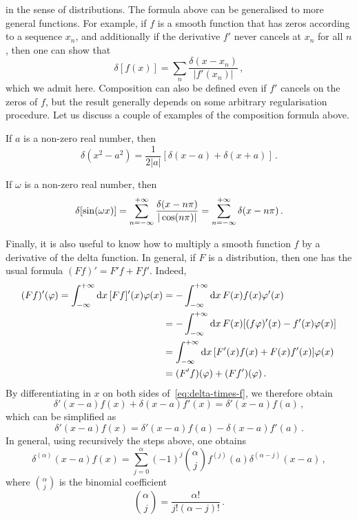 in the sense of distributions. The formula above can be generalised to more general
functions. For example, if $f$ is a smooth function that has zeros according to a sequence
$x_n$, and additionally if the derivative $f'$ never cancels at $x_n$ for all $n$, then
one can show that
\begin{equation}
	\delta[f(x)]=\sum_n\frac{\delta(x-x_n)}{|f'(x_n)|}\,,
\end{equation}
which we admit here. Composition can also be defined even if $f'$ cancels on the zeros of
$f$, but the result generally depends on some arbitrary regularisation procedure. Let us
discuss a couple of examples of the composition formula above.
\begin{example}
	If $a$ is a non-zero real number, then
	\begin{equation}
		\delta(x^2-a^2)=\frac{1}{2|a|}[\delta(x-a)+\delta(x+a)]\,.
	\end{equation}
\end{example}
\begin{example}
	If $\omega$ is a non-zero real number, then
	\begin{equation}
		\delta[\sin(\omega x)]=\sum_{n=-\infty}^{+\infty}\frac{\delta(x-n\pi)}{|\cos(n\pi)|}=\sum_{n=-\infty}^{+\infty}\delta(x-n\pi)\,.
	\end{equation}
\end{example}

Finally, it is also useful to know how to multiply a smooth function $f$ by a derivative
of the delta function. In general, if $F$ is a distribution, then one has the usual
formula $(Ff)'=F'f+Ff'$. Indeed,
\begin{align}
	(Ff)'(\varphi)=\int_{-\infty}^{+\infty}\mathrm{d}{x}\,[Ff]'(x)\varphi(x)
	 & =-\int_{-\infty}^{+\infty}\mathrm{d}{x}\,F(x)f(x)\varphi'(x)\notag                  \\
	 & =-\int_{-\infty}^{+\infty}\mathrm{d}{x}\,F(x)[(f\varphi)'(x)-f'(x)\varphi(x)]\notag \\
	 & =\int_{-\infty}^{+\infty}\mathrm{d}{x}\,[F'(x)f(x)+F(x)f'(x)]\varphi(x)\notag       \\
	 & =(F'f)(\varphi)+(Ff')(\varphi)\,.
\end{align}
By differentiating in $x$ on both sides of~\cref{eq:delta-times-f}, we therefore obtain
\begin{equation}
	\delta'(x-a)f(x)+\delta(x-a)f'(x)=\delta'(x-a)f(a)\,,
\end{equation}
which can be simplified as
\begin{equation}
	\label{eq:delta1-times-f}
	\delta'(x-a)f(x)=\delta'(x-a)f(a)-\delta(x-a)f'(a)\,.
\end{equation}
In general, using recursively the steps above, one obtains
\begin{equation}
	\label{eq:deltan-times-f}
	\delta^{(\alpha)}(x-a)f(x)
	=\sum_{j=0}^{\alpha}(-1)^j\binom{\alpha}{j}f^{(j)}(a)\delta^{(\alpha-j)}(x-a)\,,
\end{equation}
where $\binom{\alpha}{j}$ is the binomial coefficient
\begin{equation}
	\binom{\alpha}{j}=\frac{\alpha!}{j!(\alpha-j)!}\,.
\end{equation}
